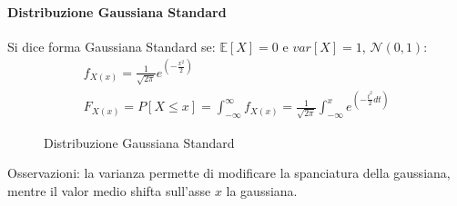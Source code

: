             \paragraph{Distribuzione Gaussiana Standard}
                Si dice forma Gaussiana Standard se: $\mathbb{E}[X] = 0$ e $var[X] = 1$, $\mathcal{N}(0,1)$:
                \begin{gather}
                    f_{X(x)} = \frac{1}{\sqrt{2\pi}} e^{\displaystyle\left(-\frac{x^2}{2}\right)}\nonumber \\
                    F_{X(x)} =P[X\leq x] = \int_{-\infty}^{\infty}f_{X(x)} =\frac{1}{\sqrt{2\pi}} \int_{-\infty}^{x}e^{\displaystyle\left(-\frac{t^2}{2}dt\right)}\nonumber 
                \end{gather}

                \begin{figure}[H]
                    \centering
                    \hfill
                    \caption{Distribuzione Gaussiana Standard}
                \end{figure}
                Osservazioni: la varianza permette di modificare la spanciatura della gaussiana, mentre il valor medio shifta sull'asse $x$ la gaussiana.

